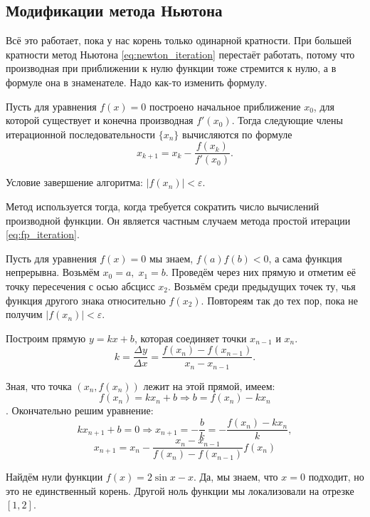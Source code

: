 \documentclass[../main.tex]{subfile}
\begin{document}
\subsection{Модификации метода Ньютона}

Всё это работает, пока у нас корень только одинарной кратности. При большей
кратности метод Ньютона \eqref{eq:newton_iteration} перестаёт работать, потому
что производная при приближении к нулю функции тоже стремится к нулю, а в
формуле она в знаменателе. Надо как-то изменить формулу.

\begin{algorithm}
	Пусть для уравнения $f(x)=0$ построено начальное приближение $x_0$, для
	которой существует и конечна производная $f'(x_0)$. Тогда следующие
	члены итерационной последовательности $\{x_n\}$ вычисляются по формуле
	\[\boxed{x_{k+1}=x_k-\frac{f(x_k)}{f'(x_0)}}.\]

	Условие завершение алгоритма: $|f(x_n)|<\varepsilon$.

	Метод используется тогда, когда требуется сократить число вычислений
	производной функции. Он является частным случаем метода простой
	итерации \eqref{eq:fp_iteration}.
\end{algorithm}

\begin{algorithm}
	Пусть для уравнения $f(x)=0$ мы знаем, $f(a)f(b)<0$, а сама функция
	непрерывна. Возьмём $x_0=a,\;x_1=b$. Проведём через них прямую и отметим
	её точку пересечения с осью абсцисс $x_2$. Возьмём среди предыдущих
	точек ту, чья функция другого знака относительно $f(x_2)$. Повтореям так
	до тех пор, пока не получим $|f(x_n)|<\varepsilon$.

	Построим прямую $y=kx+b$, которая соединяет точки $x_{n-1}$ и $x_n$.
	\[k=\frac{\Delta y}{\Delta x}=\frac{f(x_n)-f(x_{n-1})}{x_n-x_{n-1}}.\]

	Зная, что точка $(x_n,f(x_n))$ лежит на этой прямой, имеем:
	\[f(x_n)=kx_n+b\Rightarrow b=f(x_n)-kx_n\].
	Окончательно решим уравнение:
	\[kx_{n+1}+b=0\Rightarrow x_{n+1}=-\frac{b}{k}=-\frac{f(x_n)-kx_n}{k},\]
	\[\boxed{x_{n+1}=x_n-\frac{x_n-x_{n-1}}{f(x_n)-f(x_{n-1})}f(x_n)}\]
\end{algorithm}

\begin{example}
	Найдём нули функции $f(x)=2\sin x-x$. Да, мы знаем, что $x=0$ подходит,
	но это не единственный корень. Другой ноль функции мы локализовали на
	отрезке $[1,2]$.
	
\end{example}
\end{document}
